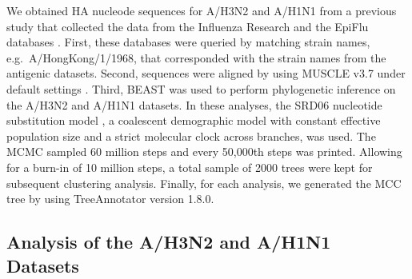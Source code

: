 \documentclass[11pt,oneside,letterpaper]{article}
\begin{document}
We obtained HA nucleode sequences for A/H3N2 and A/H1N1 from a previous study \cite{bedford_integrating_2014} that collected the data from the Influenza Research \cite{IRD} and the EpiFlu databases \cite{GISAID}. 
First, these databases were queried by matching strain names, e.g.\ A/HongKong/1/1968, that corresponded with the strain names from the antigenic datasets.
Second, sequences were aligned by using MUSCLE v3.7 under default settings \cite{MUSCLE}.
Third, BEAST\cite{drummond_beast:_2007} was used to perform phylogenetic inference on the A/H3N2 and A/H1N1 datasets.
In these analyses, the SRD06 nucleotide substitution model \cite{Shapiro06}, a coalescent demographic model with constant effective population size and a strict molecular clock across branches, was used.
The MCMC sampled 60 million steps and every 50,000th steps was printed.
Allowing for a burn-in of 10 million steps, a total sample of 2000 trees were kept for subsequent clustering analysis.
Finally, for each analysis, we generated the MCC tree by using TreeAnnotator version 1.8.0.





\subsection*{Analysis of the A/H3N2 and A/H1N1 Datasets}
\end{document}
